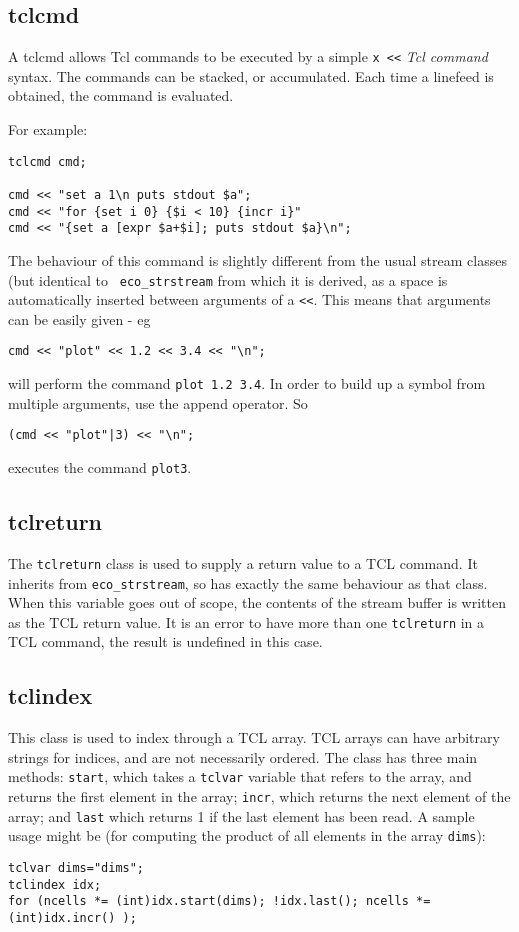 \subsection{tclcmd}

A tclcmd allows Tcl commands to be executed by a simple \verb|x <<|
{\em Tcl command} syntax. The commands can be stacked, or
accumulated. Each time a linefeed is obtained, the command is
evaluated.

\pagebreak[4]
For example:
\begin{verbatim}
tclcmd cmd;

cmd << "set a 1\n puts stdout $a";
cmd << "for {set i 0} {$i < 10} {incr i}"
cmd << "{set a [expr $a+$i]; puts stdout $a}\n";
\end{verbatim}

The behaviour of this command is slightly different from the usual
stream classes (but identical to {\tt
  eco\_strstream} from which it is derived, as a space is
automatically inserted between arguments of a \verb|<<|. This means
that arguments can be easily given - eg
\begin{verbatim}
cmd << "plot" << 1.2 << 3.4 << "\n";
\end{verbatim}
will perform the command {\tt plot 1.2 3.4}. In order to build up a
symbol from multiple arguments, use the append operator. So
\begin{verbatim}
(cmd << "plot"|3) << "\n";
\end{verbatim} 
executes the command {\tt plot3}.


\subsection{tclreturn}

The {\tt tclreturn} class is used to supply a return value to a TCL
command. It inherits from {\tt eco\_strstream},
so has exactly the same behaviour as that class. When this variable
goes out of scope, the contents of the stream buffer is written as the
TCL return value. It is an error to have more than one {\tt tclreturn}
in a TCL command, the result is undefined in this case.

\subsection{tclindex}

This class is used to index through a TCL array. TCL arrays can have
arbitrary strings for indices, and are not necessarily ordered. The
class has three main methods: {\tt start}, which takes a {\tt tclvar}
variable that refers to the array, and returns the first element in
the array; {\tt incr}, which returns the next element of the array;
and {\tt last} which returns 1 if the last element has been read. A
sample usage might be (for computing the product of all elements in
the array {\tt dims}):
\begin{verbatim}
tclvar dims="dims";
tclindex idx;
for (ncells *= (int)idx.start(dims); !idx.last(); ncells *= (int)idx.incr() );
\end{verbatim}

